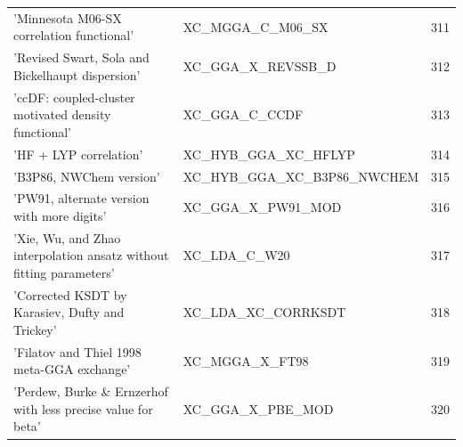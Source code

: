 \documentclass[final,12pt,makeidx,DIV=calc]{article}
\begin{document}
{{{{{{\begin{table}[!h]
\begin{center}
\begin{tabular}{llr}
  'Minnesota M06-SX correlation functional' & XC\_MGGA\_C\_M06\_SX  &311\\
  'Revised Swart, Sola and Bickelhaupt dispersion' & XC\_GGA\_X\_REVSSB\_D  &312\\
  'ccDF: coupled-cluster motivated density functional' & XC\_GGA\_C\_CCDF  &313\\
  'HF + LYP correlation' & XC\_HYB\_GGA\_XC\_HFLYP  &314\\
  'B3P86, NWChem version' & XC\_HYB\_GGA\_XC\_B3P86\_NWCHEM  &315\\
  'PW91, alternate version with more digits' & XC\_GGA\_X\_PW91\_MOD  &316\\
  'Xie, Wu, and Zhao interpolation ansatz without fitting parameters' & XC\_LDA\_C\_W20  &317\\
  'Corrected KSDT by Karasiev, Dufty and Trickey' & XC\_LDA\_XC\_CORRKSDT  &318\\
  'Filatov and Thiel 1998 meta-GGA exchange' & XC\_MGGA\_X\_FT98  &319\\
  'Perdew, Burke \& Ernzerhof with less precise value for beta' & XC\_GGA\_X\_PBE\_MOD  &320\\
\hline
\hline
\end{tabular}
\end{center}
\end{table}

}}}}}}
\end{document}
